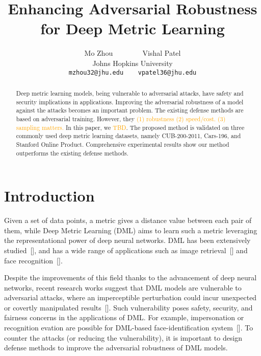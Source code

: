 \documentclass[10pt,twocolumn,letterpaper]{article}
\newcommand{\oo}[1]{\textcolor{orange}{#1}}
\begin{document}
\title{Enhancing Adversarial Robustness for Deep Metric Learning}

\author{Mo Zhou ~~~~~~~ Vishal Patel\\
Johns Hopkins University\\
{\tt\small mzhou32@jhu.edu ~~ vpatel36@jhu.edu}
}
\maketitle

\begin{abstract}
	Deep metric learning models, being vulnerable to adversarial
	attacks, have safety and security implications in applications.
	Improving the adversarial robustness of a model against the attacks becomes
	an important problem.
	The existing defense methods are based on adversarial training.
	However, they \oo{(1) robustness (2) speed/cost. (3) sampling matters.}
	In this paper, we \oo{TBD}.
	The proposed method is validated on three commonly
	used deep metric learning datasets, namely CUB-200-2011, Cars-196,
	and Stanford Online Product.
	Comprehensive experimental results show our method outperforms
	the existing defense methods.
\end{abstract}

\section{Introduction}
\label{sec:1}


Given a set of data points, a metric gives a distance value between each pair
of them, while Deep Metric Learning (DML) aims to learn such a metric
leveraging the representational power of deep neural networks.
%
DML has been extensively studied~[], and has a wide range of applications
such as image retrieval~[] and face recognition~[].


Despite the improvements of this field thanks to the advancement of deep neural
networks, recent research works suggest that DML models are vulnerable to
adversarial attacks, where an imperceptible perturbation could incur unexpected
or covertly manipulated results~[].
%
Such vulnerability poses safety, security, and fairness concerns in the
applications of DML.
%
For example, impersonation or recognition evation are possible for DML-based
face-identification system~[].
%
To counter the attacks (or reducing the vulnerability), it is important to
design defense methods to improve the adversarial robustness of DML models.
\end{document}
